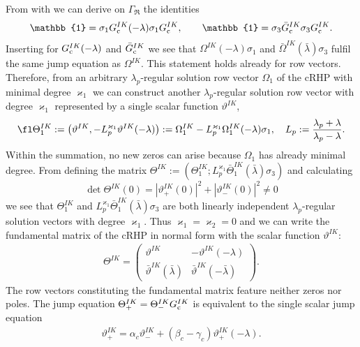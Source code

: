 \documentclass[12pt]{iopart}
\begin{document}
From  with  we can derive on $\Gamma_\Re$ the identities
\begin{eqnarray}
\mathbb{1}=\sigma_1 G_{\rm c}^{IK}(-\lambda)\sigma_1 G_{\rm c}^{IK},\quad\quad 
\mathbb{1}=\sigma_3 \bar{G}_{\rm c}^{IK}\sigma_3 G_{\rm c}^{IK}.
\end{eqnarray}
Inserting  for $G_{\rm c}^{IK}(-\lambda)$ and $\bar{G}_{\rm c}^{IK}$ we see that $\Omega^{IK}(-\lambda)\sigma_1$ and $\bar{\Omega}^{IK}(\bar{\lambda})\sigma_3$ fulfil the same jump equation as $\Omega^{IK}$. This statement holds already for row vectors. Therefore, from an arbitrary $\lambda_p$-regular solution row vector $\Omega_1$ of the cRHP with minimal degree $\varkappa_1$ we can construct another $\lambda_p$-regular solution row vector with degree $\varkappa_1$ represented by a single scalar function $\vartheta^{IK}$,
\begin{equation}
\fl\Theta^{IK}_1:=\left(\vartheta^{IK},-L_p^{\varkappa_1}\vartheta^{IK}(-\lambda)\right)
:=\Omega^{IK}_1-L_p^{\varkappa_1}\Omega^{IK}_1(-\lambda)\sigma_1, \quad
L_p:=\frac{\lambda_p+\lambda}{\lambda_p-\lambda}.
\end{equation}
Within the summation, no new zeros can arise because $\Omega_1$ has already minimal degree. From defining the matrix $\Theta^{IK}:=\left(\Theta^{IK}_1;L_p^{\varkappa_1}\bar{\Theta}^{IK}_1(\bar{\lambda})\sigma_3\right)$ and calculating
\begin{equation}
\det\Theta^{IK}(0)=|\vartheta^{IK}_{+}(0)|^2+|\vartheta^{IK}_{-}(0)|^2\neq 0 
\end{equation}
we see that $\Theta^{IK}_1$ and $L_p^{\varkappa_1}\bar{\Theta}^{IK}_1(\bar{\lambda})\sigma_3$ are both linearly independent $\lambda_p$-regular solution vectors with degree $\varkappa_1$. Thus $\varkappa_1=\varkappa_2=0$ and we can write the fundamental matrix of the cRHP in normal form with the scalar function $\vartheta^{IK}$:
\begin{eqnarray} 
\Theta^{IK}=\left(\begin{array}{cc} \vartheta^{IK} & -\vartheta^{IK}(-\lambda) \\  \bar{\vartheta}^{IK}(\bar{\lambda})& \bar{\vartheta}^{IK}(-\bar{\lambda}) \end{array}\right).
\label{MatrixForm}
\end{eqnarray}
The row vectors constituting the fundamental matrix feature neither zeros nor poles. The jump equation $\Theta^{IK}_+=\Theta^{IK}_-G_{\rm c}^{IK}$ is equivalent to the single scalar jump equation
\begin{eqnarray}
\vartheta^{IK}_+=\alpha_c \vartheta^{IK}_-+(\beta_c-\gamma_c)\vartheta^{IK}_+(-\lambda). \label{Sprungtheta}
\end{eqnarray}
\end{document}
